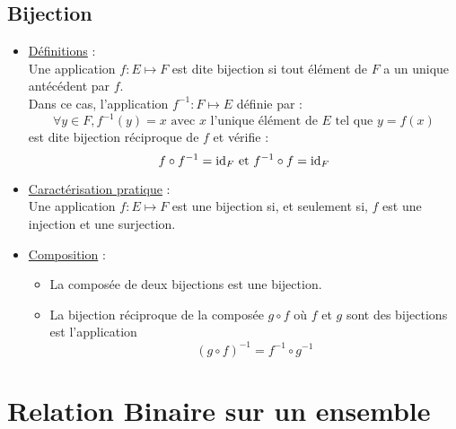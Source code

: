 \subsection{Bijection}
\begin{defprop}
    \begin{itemize}
        \item \underline{Définitions} : \\
        Une application \(f : E \mapsto F\) est dite bijection si tout élément de \(F\) a un unique antécédent par \(f\).\\
        Dans ce cas, l’application \(f ^{-1} : F \mapsto E\) définie par :
        \[\forall y \in F, f^{-1}(y) = x \text{ avec } x \text{ l’unique élément de }E \text{ tel que } y = f (x)\]
        est dite bijection réciproque de \(f\) et vérifie :
        \[f \circ f^{-1} = \mathrm{id}_{F} \text{ et } f^{-1} \circ f = \mathrm{id}_{F}\]
        \item \underline{ Caractérisation pratique} :\\
        Une application \(f : E \mapsto F\) est une bijection si, et seulement si, \(f\) est une injection et une surjection.
        \item \underline{Composition} :
        \begin{itemize}
            \item La composée de deux bijections est une bijection.
            \item La bijection réciproque de la composée \(g \circ f\) où \(f\) et \(g\) sont des bijections est l’application
            \[(g \circ f )^{-1} = f ^{-1} \circ g^{-1}\]
        \end{itemize}
    \end{itemize}
\end{defprop}

\section{Relation Binaire sur un ensemble}

